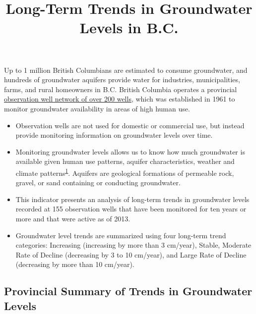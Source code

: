 \documentclass[
]{article}
\title{Long-Term Trends in Groundwater Levels in B.C.}
\author{}
\date{\vspace{-2.5em}}
\begin{document}
\maketitle

Up to 1 million British Columbians are estimated to consume groundwater,
and hundreds of groundwater aquifers provide water for industries,
municipalities, farms, and rural homeowners in B.C. British Columbia
operates a provincial
\href{https://www2.gov.bc.ca/gov/content?id=B03D0994BB5C4F98B6F7D4FD8610C836}{observation
well network of over 200 wells}, which was established in 1961 to
monitor groundwater availability in areas of high human use.

\begin{itemize}
\item
  Observation wells are not used for domestic or commercial use, but
  instead provide monitoring information on groundwater levels over
  time.
\item
  Monitoring groundwater levels allows us to know how much groundwater
  is available given human use patterns, aquifer characteristics,
  weather and climate
  patterns\textsuperscript{\protect\hyperlink{fn1}{1}}. Aquifers are
  geological formations of permeable rock, gravel, or sand containing or
  conducting groundwater.
\item
  This indicator presents an analysis of long-term trends in groundwater
  levels recorded at 155 observation wells that have been monitored for
  ten years or more and that were active as of 2013.
\item
  Groundwater level trends are summarized using four long-term trend
  categories: Increasing (increasing by more than 3 cm/year), Stable,
  Moderate Rate of Decline (decreasing by 3 to 10 cm/year), and Large
  Rate of Decline (decreasing by more than 10 cm/year).
\end{itemize}

\newpage

\hypertarget{provincial-summary-of-trends-in-groundwater-levels}{%
\subsection{Provincial Summary of Trends in Groundwater
Levels}\label{provincial-summary-of-trends-in-groundwater-levels}}
\end{document}
